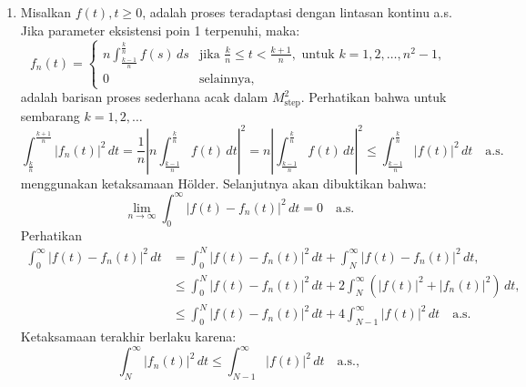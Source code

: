 \documentclass[aspectratio=169,11pt]{beamer}
\theoremstyle{definition}
\begin{document}
\begin{frame}[allowframebreaks]{\insertsection}{\insertsubsection}
  \begin{enumerate}
    \item Misalkan $f(t), t \geq 0$, adalah proses teradaptasi dengan lintasan kontinu a.s. Jika parameter eksistensi poin 1 terpenuhi, maka:
          \begin{equation*}
            f_n(t) = \begin{cases}
              n \int_{\frac{k-1}{n}}^{\frac{k}{n}} f(s) \, ds & \text{jika } \frac{k}{n} \leq t < \frac{k+1}{n}, \text{ untuk } k = 1, 2, \dots, n^2-1, \\
              0                                               & \text{selainnya},
            \end{cases}
          \end{equation*}
          adalah barisan proses sederhana acak dalam $M_{\text{step}}^2$. Perhatikan bahwa untuk sembarang $k = 1, 2, \dots$
          \begin{equation*}
            \int_{\frac{k}{n}}^{\frac{k+1}{n}} |f_n(t)|^2 \, dt = \frac{1}{n} \left| n \int_{\frac{k-1}{n}}^{\frac{k}{n}} f(t) \, dt \right|^2 = n \left| \int_{\frac{k-1}{n}}^{\frac{k}{n}} f(t) \, dt \right|^2 \leq \int_{\frac{k-1}{n}}^{\frac{k}{n}} |f(t)|^2 \, dt \quad \text{a.s.}
          \end{equation*}
          menggunakan ketaksamaan Hölder. Selanjutnya akan dibuktikan bahwa:
          \begin{equation*}
            \lim_{n \to \infty} \int_0^\infty |f(t) - f_n(t)|^2 \, dt = 0 \quad \text{a.s.}
          \end{equation*}
          Perhatikan
          \begin{align*}
            \int_0^\infty |f(t) - f_n(t)|^2 \, dt & = \int_0^N |f(t) - f_n(t)|^2 \, dt + \int_N^\infty |f(t) - f_n(t)|^2 \, dt,                  \\
                                                  & \leq \int_0^N |f(t) - f_n(t)|^2 \, dt + 2 \int_N^\infty (|f(t)|^2 + |f_n(t)|^2) \, dt,       \\
                                                  & \leq \int_0^N |f(t) - f_n(t)|^2 \, dt + 4 \int_{N-1}^\infty |f(t)|^2 \, dt \quad \text{a.s.}
          \end{align*}
          Ketaksamaan terakhir berlaku karena:
          \begin{equation*}
            \int_N^\infty |f_n(t)|^2 \, dt \leq \int_{N-1}^\infty |f(t)|^2 \, dt \quad \text{a.s.},

\end{equation*}
\end{enumerate}
\end{frame}
\end{document}
